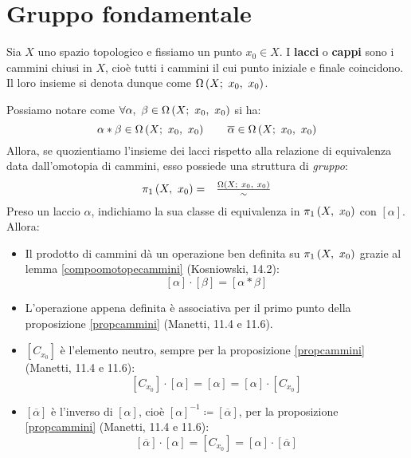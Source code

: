 \section{Gruppo fondamentale}
\begin{define}
	Sia $X$ uno spazio topologico e fissiamo un punto $x_0\in X$. I \textbf{lacci} o \textbf{cappi} sono i cammini chiusi in $X$, cioè tutti i cammini il cui punto iniziale e finale coincidono. Il loro insieme si denota dunque come $\Omega\left(X;\ x_0,\ x_0\right)$.
\end{define}
\begin{observe}
	Possiamo notare come $\forall\alpha,\ \beta\in\inscam{X}{x_0}{x_0}$ si ha:
	\begin{equation*}
		\alpha\ast\beta\in\Omega\left(X;\ x_0,\ x_0\right)\qquad \overline{\alpha}\in\Omega\left(X;\ x_0,\ x_0\right)
	\end{equation*}
Allora, se quozientiamo l'insieme dei lacci rispetto alla relazione di equivalenza data dall'omotopia di cammini, esso possiede una struttura di \textit{gruppo}:
\begin{equation}
	\begin{array}{cc}
	\gruf{X}{x_0}=&\frac{\inscam{X}{x_0}{x_0}}{\sim}
	\end{array}	
\end{equation}
Preso un laccio $\alpha$, indichiamo la sua classe di equivalenza in $\gruf{X}{x_0}$ con $\left[\alpha\right]$. Allora:
\begin{itemize}
	\item Il prodotto di cammini dà un operazione ben definita su $\gruf{X}{x_0}$ grazie al lemma \ref{compoomotopecammini} (Kosniowski, 14.2):
	\begin{equation}
		\left[\alpha\right]\cdot\left[\beta\right]=\left[\alpha\ast\beta\right]
	\end{equation}
\item L'operazione appena definita è associativa per il primo punto della proposizione \ref{propcammini} (Manetti, 11.4 e 11.6).
\item $\left[C_{x_0}\right]$ è l'elemento neutro, sempre per la proposizione \ref{propcammini} (Manetti, 11.4 e 11.6):
\begin{equation}
	\left[C_{x_0}\right]\cdot\left[\alpha\right]=\left[\alpha\right]=\left[\alpha\right]\cdot\left[C_{x_0}\right]
\end{equation} 
\item $\left[\overline{\alpha}\right]$ è l'inverso di $\left[\alpha\right]$, cioè $\left[\alpha\right]^{-1}\coloneqq\left[\overline{\alpha}\right]$, per la proposizione \ref{propcammini} (Manetti, 11.4 e 11.6):
\begin{equation}
\left[\overline{\alpha}\right]\cdot\left[\alpha\right]=\left[C_{x_0}\right]=\left[\alpha\right]\cdot\left[\overline{\alpha}\right]
\end{equation}
\end{itemize}
\end{observe}
